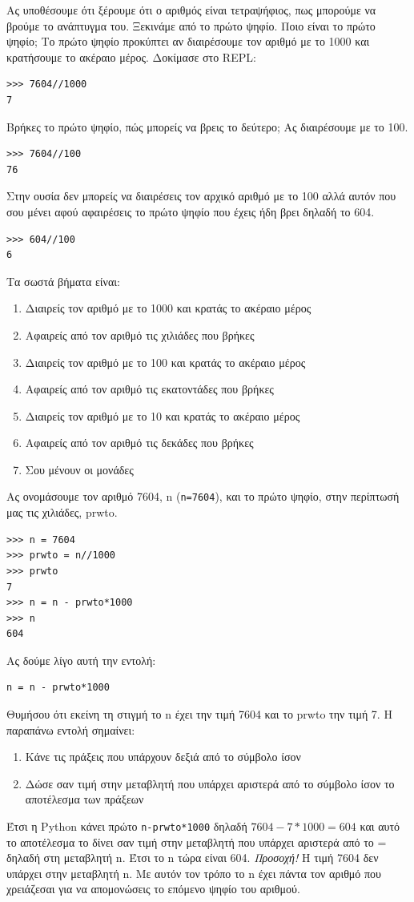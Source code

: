 \documentclass[b5paper,11pt,twoside,openleft]{memoir}
\begin{document}
Ας υποθέσουμε ότι ξέρουμε ότι ο αριθμός είναι τετραψήφιος, πως μπορούμε να βρούμε το ανάπτυγμα του. Ξεκινάμε από το πρώτο ψηφίο. Ποιο είναι το πρώτο ψηφίο; Το πρώτο ψηφίο προκύπτει αν διαιρέσουμε τον αριθμό με το 1000 και κρατήσουμε το ακέραιο μέρος.
Δοκίμασε στο REPL:
\begin{lstlisting}
>>> 7604//1000
7
\end{lstlisting}
Βρήκες το πρώτο ψηφίο, πώς μπορείς να βρεις το δεύτερο; Ας διαιρέσουμε με το 100.
\begin{lstlisting}
>>> 7604//100
76
\end{lstlisting}
Στην ουσία δεν μπορείς να διαιρέσεις τον αρχικό αριθμό με το 100 αλλά αυτόν που σου μένει αφού αφαιρέσεις το πρώτο ψηφίο που έχεις ήδη βρει δηλαδή το 604.
\begin{lstlisting}
>>> 604//100
6
\end{lstlisting}

Τα σωστά βήματα είναι:
\begin{enumerate}
    \item Διαιρείς τον αριθμό με το 1000 και κρατάς το ακέραιο μέρος 
    \item Αφαιρείς από τον αριθμό τις χιλιάδες που βρήκες
    \item Διαιρείς τον αριθμό με το 100 και κρατάς το ακέραιο μέρος
    \item Αφαιρείς από τον αριθμό τις εκατοντάδες που βρήκες
    \item Διαιρείς τον αριθμό με το 10 και κρατάς το ακέραιο μέρος
    \item Αφαιρείς από τον αριθμό τις δεκάδες που βρήκες
    \item Σου μένουν οι μονάδες
\end{enumerate}
Ας ονομάσουμε τον αριθμό 7604, n (\lstinline{n=7604}), και το πρώτο ψηφίο, στην περίπτωσή μας τις χιλιάδες, prwto.
\begin{lstlisting}
>>> n = 7604
>>> prwto = n//1000
>>> prwto
7
>>> n = n - prwto*1000
>>> n
604
\end{lstlisting}

Ας δούμε λίγο αυτή την εντολή:
\begin{lstlisting}
n = n - prwto*1000
\end{lstlisting}
Θυμήσου ότι εκείνη τη στιγμή το n έχει την τιμή 7604 και το prwto την τιμή 7. Η παραπάνω εντολή σημαίνει:
\begin{enumerate}
    \item Κάνε τις πράξεις που υπάρχουν δεξιά από το σύμβολο ίσον
    \item Δώσε σαν τιμή στην μεταβλητή που υπάρχει αριστερά από το σύμβολο ίσον το αποτέλεσμα των πράξεων
\end{enumerate}
Έτσι η Python κάνει πρώτο \lstinline{n-prwto*1000} δηλαδή $7604-7*1000 = 604$ και αυτό το αποτέλεσμα το δίνει σαν τιμή στην μεταβλητή που υπάρχει αριστερά από το = δηλαδή στη μεταβλητή n. Έτσι το n τώρα είναι 604. \emph{Προσοχή!} Η τιμή 7604 δεν υπάρχει στην μεταβλητή n. Με αυτόν τον τρόπο το n έχει πάντα τον αριθμό που χρειάζεσαι για να απομονώσεις το επόμενο ψηφίο του αριθμού.
\end{document}
